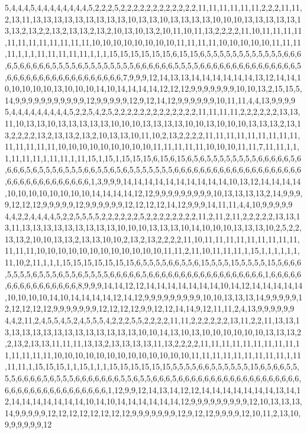 5,4,4,4,5,4,4,4,4,4,4,4,4,5,2,2,2,5,2,2,2,2,2,2,2,2,2,2,2,2,11,11,11,11,11,11,2,2,2,11,11,2,13,11,13,13,13,13,13,13,13,13,13,10,13,13,10,13,13,13,13,10,10,10,13,13,13,13,13,13,13,2,13,2,2,13,2,13,13,2,13,2,10,13,10,13,2,10,11,10,11,13,2,2,2,2,11,10,11,11,11,11,11,11,11,11,11,11,11,11,10,10,10,10,10,10,10,10,11,11,11,11,10,10,10,10,10,11,11,11,11,1,1,1,11,11,11,11,11,1,1,1,15,15,15,15,15,15,6,15,15,6,5,5,5,5,5,5,5,5,5,5,5,5,6,6,6,6,5,6,6,6,6,6,5,5,5,5,6,5,5,5,5,5,5,5,5,6,6,6,6,6,6,5,5,5,5,6,6,6,6,6,6,6,6,6,6,6,6,6,6,6,5,6,6,6,6,6,6,6,6,6,6,6,6,6,6,6,6,6,6,7,9,9,9,12,14,13,13,14,14,14,14,14,14,13,12,14,14,10,10,10,10,10,13,10,10,10,14,10,14,14,14,14,12,12,12,9,9,9,9,9,9,9,10,10,13,2,15,15,5,14,9,9,9,9,9,9,9,9,9,9,9,12,9,9,9,9,9,12,9,12,14,12,9,9,9,9,9,9,10,11,11,4,4,13,9,9,9,9
5,4,4,4,4,4,4,4,4,4,5,2,2,5,4,2,5,2,2,2,2,2,2,2,2,2,2,2,2,2,11,11,11,11,2,2,2,2,2,2,13,13,11,10,13,13,10,13,13,13,13,13,10,10,10,13,13,13,13,10,10,13,10,10,10,13,13,13,2,13,13,2,2,2,2,13,2,13,13,2,13,2,10,13,13,10,11,10,2,13,2,2,2,2,11,11,11,11,11,11,11,11,11,11,11,11,11,11,10,10,10,10,10,10,10,10,10,11,11,11,11,11,10,10,10,11,11,7,11,11,1,1,1,11,11,11,1,11,11,1,11,15,1,15,1,15,15,15,6,15,6,15,6,5,6,5,5,5,5,5,5,5,5,6,6,6,6,6,5,6,6,6,6,5,6,5,5,5,6,5,5,5,6,6,5,5,6,5,6,5,5,5,5,5,5,5,6,6,6,6,6,6,6,6,6,6,6,6,6,6,6,6,6,6,6,6,6,6,6,6,6,6,6,6,6,6,6,6,6,1,3,9,9,9,14,14,14,14,14,14,14,14,14,14,10,13,12,14,14,14,14,10,10,10,10,10,10,10,10,14,14,14,14,12,12,9,9,9,9,9,9,9,9,9,10,13,13,13,13,2,14,9,9,9,9,12,12,12,9,9,9,9,9,12,9,9,9,9,9,9,12,12,12,12,14,12,9,9,9,14,11,11,4,4,10,9,9,9,9,9
4,4,2,2,4,4,4,4,5,2,2,5,5,5,5,2,2,2,2,2,2,5,2,2,2,2,2,2,2,2,11,2,11,2,11,2,2,2,2,2,13,13,13,11,13,13,13,13,13,13,13,13,13,10,10,10,13,13,13,10,14,10,10,10,13,13,13,10,2,5,2,2,13,13,2,10,10,13,13,2,13,13,10,10,2,13,2,13,2,2,2,2,11,10,11,11,11,11,11,11,11,11,11,11,11,11,10,10,10,10,10,10,10,10,10,10,10,10,11,11,2,11,10,11,11,11,1,15,1,1,1,1,1,1,11,10,2,11,1,1,1,15,15,15,15,15,15,15,6,5,5,5,5,6,6,5,5,6,15,5,5,5,15,5,5,5,5,15,5,6,6,6,5,5,5,5,6,5,5,5,6,5,5,6,5,5,5,5,6,6,6,6,6,5,6,6,6,6,6,6,6,6,6,6,6,6,6,6,6,6,6,6,1,6,6,6,6,6,6,6,6,6,6,6,6,6,6,6,6,8,9,9,9,14,14,12,12,14,14,14,14,14,14,14,10,14,12,14,14,14,14,14,10,10,10,10,14,10,14,14,14,14,12,14,12,9,9,9,9,9,9,9,9,9,10,10,13,13,13,14,9,9,9,9,9,12,12,12,12,12,9,9,9,9,9,9,9,12,12,12,12,9,9,12,12,14,14,9,12,11,11,2,4,13,9,9,9,9,9,9
4,4,2,11,2,4,5,5,4,5,2,4,5,5,5,4,2,2,2,5,5,2,2,2,2,11,11,2,2,2,2,2,2,13,11,2,2,11,13,13,13,13,13,13,13,13,13,13,13,13,13,13,13,10,10,14,13,10,13,10,10,10,10,10,10,13,13,13,2,2,13,2,13,13,11,11,11,13,13,2,13,13,13,13,11,13,2,2,2,2,11,11,11,11,11,11,11,11,11,11,11,11,11,11,10,10,10,10,10,10,10,10,10,10,10,10,10,11,11,11,11,11,11,11,11,11,1,11,11,11,1,15,15,15,1,1,15,1,1,1,15,15,15,15,15,15,5,5,5,5,6,6,5,5,5,5,5,5,15,6,5,6,6,5,5,5,5,6,6,6,6,5,6,5,5,5,6,6,6,6,6,6,6,5,5,6,5,5,6,6,6,5,6,6,6,6,6,6,6,6,6,6,6,6,6,6,6,6,6,6,6,6,6,6,6,6,6,6,6,6,6,6,6,6,6,6,6,1,12,9,9,12,14,13,14,12,12,14,14,14,14,14,14,14,13,14,12,14,14,14,14,14,14,14,10,14,10,14,14,14,14,14,14,12,9,9,9,9,9,9,9,9,9,12,10,13,13,13,14,9,9,9,9,9,12,12,12,12,12,12,12,12,9,9,9,9,9,9,9,12,9,12,12,9,9,9,9,12,10,11,2,13,10,9,9,9,9,9,9,12
